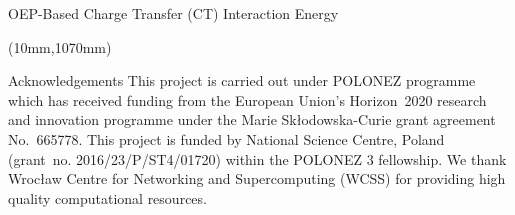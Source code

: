 \documentclass[final]{beamer} %
\begin{document}
\begin{frame}{OEP-Based Charge Transfer (CT) Interaction Energy}
\begin{textblock*}{820mm}(10mm,1070mm)
\begin{block}{Acknowledgements}
 This project is carried out under POLONEZ programme which has received funding from the European Union's
 Horizon~2020 research and innovation programme under the Marie Sk{\l}odowska-Curie grant agreement 
 No.~665778. This project is funded by National Science Centre, Poland 
 (grant~no. 2016/23/P/ST4/01720) within the POLONEZ 3 fellowship.
 We thank
 Wroc{\l}aw Centre for Networking and Supercomputing (WCSS) for
 providing high quality computational resources.
\end{block}
\end{textblock*}


\end{frame}
\end{document}
